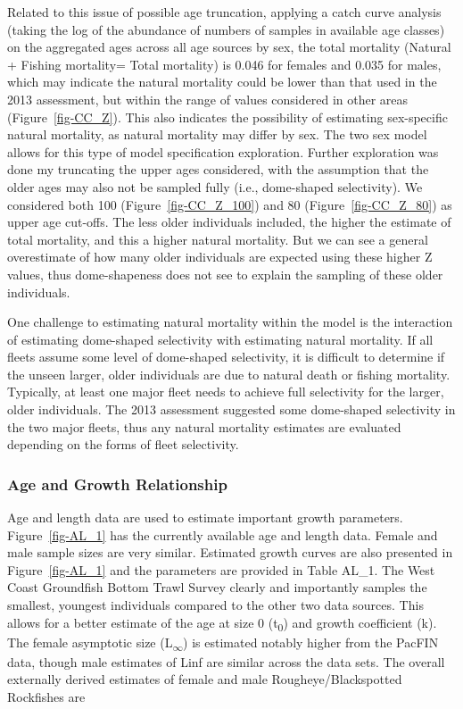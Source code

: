\documentclass[
]{scrartcl}
\begin{document}
Related to this issue of possible age truncation, applying a catch curve
analysis (taking the log of the abundance of numbers of samples in
available age classes) on the aggregated ages across all age sources by
sex, the total mortality (Natural + Fishing mortality= Total mortality)
is 0.046 for females and 0.035 for males, which may indicate the natural
mortality could be lower than that used in the 2013 assessment, but
within the range of values considered in other areas
(Figure~\ref{fig-CC_Z}). This also indicates the possibility of
estimating sex-specific natural mortality, as natural mortality may
differ by sex. The two sex model allows for this type of model
specification exploration. Further exploration was done my truncating
the upper ages considered, with the assumption that the older ages may
also not be sampled fully (i.e., dome-shaped selectivity). We considered
both 100 (Figure~\ref{fig-CC_Z_100}) and 80 (Figure~\ref{fig-CC_Z_80})
as upper age cut-offs. The less older individuals included, the higher
the estimate of total mortality, and this a higher natural mortality.
But we can see a general overestimate of how many older individuals are
expected using these higher Z values, thus dome-shapeness does not see
to explain the sampling of these older individuals.

One challenge to estimating natural mortality within the model is the
interaction of estimating dome-shaped selectivity with estimating
natural mortality. If all fleets assume some level of dome-shaped
selectivity, it is difficult to determine if the unseen larger, older
individuals are due to natural death or fishing mortality. Typically, at
least one major fleet needs to achieve full selectivity for the larger,
older individuals. The 2013 assessment suggested some dome-shaped
selectivity in the two major fleets, thus any natural mortality
estimates are evaluated depending on the forms of fleet selectivity.

\subsubsection{Age and Growth
Relationship}\label{age-and-growth-relationship}

Age and length data are used to estimate important growth parameters.
Figure~\ref{fig-AL_1} has the currently available age and length data.
Female and male sample sizes are very similar. Estimated growth curves
are also presented in Figure~\ref{fig-AL_1} and the parameters are
provided in Table AL\_1. The West Coast Groundfish Bottom Trawl Survey
clearly and importantly samples the smallest, youngest individuals
compared to the other two data sources. This allows for a better
estimate of the age at size 0 (t\textsubscript{0}) and growth
coefficient (k). The female asymptotic size
(L\textsubscript{\(\infty\)}) is estimated notably higher from the
PacFIN data, though male estimates of Linf are similar across the data
sets. The overall externally derived estimates of female and male
Rougheye/Blackspotted Rockfishes are
\end{document}
